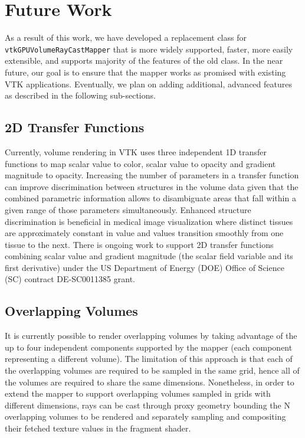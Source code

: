 \section{Future Work}
\label{future-work}
As a result of this work, we have developed a replacement class for
\texttt{vtkGPUVolumeRayCastMapper} that is more widely supported, faster, more
easily extensible, and supports majority of the features of the old class. In
the near future, our goal is to ensure that the mapper works as promised with
existing VTK applications. Eventually, we plan on adding additional, advanced
features as described in the following sub-sections.

\subsection{2D Transfer Functions}
\label{2d-transfer-functions}
Currently, volume rendering in VTK uses three independent 1D transfer functions
to map scalar value to color, scalar value to opacity and gradient magnitude to
opacity. Increasing the number of parameters in a transfer function can improve
discrimination between structures in the volume data given that the combined
parametric information allows to disambiguate areas that fall within a given
range of those parameters simultaneously. Enhanced structure discrimination is
beneficial in medical image visualization where distinct tissues are
approximately constant in value and values transition smoothly from one tissue
to the next. There is ongoing work to support 2D transfer functions combining
scalar value and gradient magnitude (the scalar field variable and its first
derivative) under the US Department of Energy (DOE) Office of Science (SC)
contract DE-SC0011385 grant.

\subsection{Overlapping Volumes}
\label{overlapping-volumes}
It is currently possible to render overlapping volumes by taking advantage of
the up to four independent components supported by the mapper (each component
representing a different volume).
The limitation of this approach is that each of the overlapping volumes are
required to be sampled in the same grid, hence all of the volumes are required
to share the same dimensions.  Nonetheless, in order to extend the mapper to
support overlapping volumes sampled in grids with different dimensions, rays
can be cast through proxy geometry bounding the N overlapping volumes to be
rendered and separately sampling and compositing their fetched texture values in
the fragment shader.

